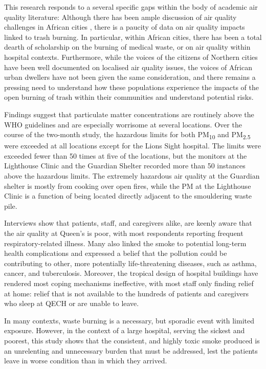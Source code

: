 \documentclass[
  authoryear,
  review,
  3p]{elsarticle}
\begin{document}
This research responds to a several specific gaps within the body of
academic air quality literature: Although there has been ample
discussion of air quality challenges in African cities
\citep{mbow-diokhane2019air, miralvarez2020scoping, petkova2013particulate, singh2021aira},
there is a paucity of data on air quality impacts linked to trash
burning. In particular, within African cities, there has been a total
dearth of scholarship on the burning of medical waste, or on air quality
within hospital contexts. Furthermore, while the voices of the citizens
of Northern cities
\citep{deguen2012new, howel2002urban, reames2019people} have been well
documented on localised air quality issues, the voices of African urban
dwellers have not been given the same consideration, and there remains a
pressing need to understand how these populations experience the impacts
of the open burning of trash within their communities and understand
potential risks.

Findings suggest that particulate matter concentrations are routinely
above the WHO guidelines and are especially worrisome at several
locations. Over the course of the two-month study, the hazardous limits
for both PM\textsubscript{10} and PM\textsubscript{2.5} were exceeded at
all locations except for the Lions Sight hospital. The limits were
exceeded fewer than 50 times at five of the locations, but the monitors
at the Lighthouse Clinic and the Guardian Shelter recorded more than 50
instances above the hazardous limits. The extremely hazardous air
quality at the Guardian shelter is mostly from cooking over open fires,
while the PM at the Lighthouse Clinic is a function of being located
directly adjacent to the smouldering waste pile.

Interviews show that patients, staff, and caregivers alike, are keenly
aware that the air quality at Queen's is poor, with most respondents
reporting frequent respiratory-related illness. Many also linked the
smoke to potential long-term health complications and expressed a belief
that the pollution could be contributing to other, more potentially
life-threatening diseases, such as asthma, cancer, and tuberculosis.
Moreover, the tropical design of hospital buildings have rendered most
coping mechanisms ineffective, with most staff only finding relief at
home: relief that is not available to the hundreds of patients and
caregivers who sleep at QECH or are unable to leave.

In many contexts, waste burning is a necessary, but sporadic event with
limited exposure. However, in the context of a large hospital, serving
the sickest and poorest, this study shows that the consistent, and
highly toxic smoke produced is an unrelenting and unnecessary burden
that must be addressed, lest the patients leave in worse condition than
in which they arrived.
\end{document}
